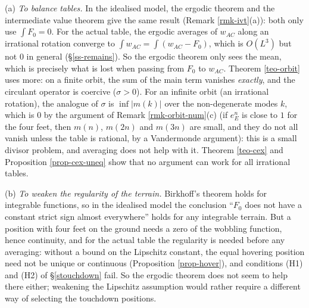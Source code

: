 \documentclass[a4paper,11pt,twoside,leqno]{article}
\numberwithin{equation}{section}
\begin{document}
\begin{rmk}\label{rmk-ergodic}
(a) \emph{To balance tables.} In the idealised model, the ergodic theorem and the intermediate value theorem give the same result (Remark \ref{rmk-ivt}(a)): both only use $\int F_0 = 0$. For the actual table, the ergodic averages of $w_{AC}$ along an irrational rotation converge to $\int w_{AC} = \int (w_{AC} - F_0)$, which is $O(L^3)$ but not $0$ in general (\S{}\ref{ss-remains}). So the ergodic theorem only sees the mean, which is precisely what is lost when passing from $F_0$ to $w_{AC}$. Theorem \ref{teo-orbit} uses more: on a finite orbit, the sum of the main term vanishes \emph{exactly}, and the circulant operator is coercive ($\sigma > 0$). For an infinite orbit (an irrational rotation), the analogue of $\sigma$ is $\inf |m(k)|$ over the non-degenerate modes $k$, which is $0$ by the argument of Remark \ref{rmk-orbit-num}(c) (if $e_E^n$ is close to $1$ for the four feet, then $m(n)$, $m(2n)$ and $m(3n)$ are small, and they do not all vanish unless the table is rational, by a Vandermonde argument): this is a small divisor problem, and averaging does not help with it. Theorem \ref{teo-cex} and Proposition \ref{prop-cex-uneq} show that no argument can work for all irrational tables.

(b) \emph{To weaken the regularity of the terrain.} Birkhoff's theorem holds for integrable functions, so in the idealised model the conclusion ``$F_0$ does not have a constant strict sign almost everywhere'' holds for any integrable terrain. But a position with four feet on the ground needs a zero of the wobbling function, hence continuity, and for the actual table the regularity is needed before any averaging: without a bound on the Lipschitz constant, the equal hovering position need not be unique or continuous (Proposition \ref{prop-hover}), and conditions (H1) and (H2) of \S{}\ref{stouchdown} fail. So the ergodic theorem does not seem to help there either; weakening the Lipschitz assumption would rather require a different way of selecting the touchdown positions.
\end{rmk}
\end{document}
